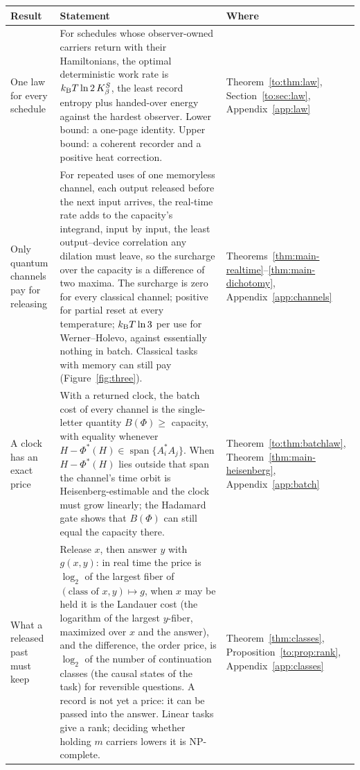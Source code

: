 \begin{table}[tbp]
\centering
\small
\begin{tabular}{@{}>{\raggedright\arraybackslash}p{3.1cm}>{\raggedright\arraybackslash}p{10.0cm}>{\raggedright\arraybackslash}p{2.5cm}@{}}
\toprule
Result & Statement & Where\\
\midrule
One law for every schedule & For schedules whose observer-owned carriers return with their Hamiltonians, the optimal deterministic work rate is $k_{\mathrm B} T\ln2\,K_\beta^S$, the least record entropy plus handed-over energy against the hardest observer. Lower bound: a one-page identity. Upper bound: a coherent recorder and a positive heat correction. & Theorem~\ref{to:thm:law}, Section~\ref{to:sec:law}, Appendix~\ref{app:law}\\
Only quantum channels pay for releasing & For repeated uses of one memoryless channel, each output released before the next input arrives, the real-time rate adds to the capacity's integrand, input by input, the least output--device correlation any dilation must leave, so the surcharge over the capacity is a difference of two maxima. The surcharge is zero for every classical channel; positive for partial reset at every temperature; $k_{\mathrm B} T\ln3$ per use for Werner--Holevo, against essentially nothing in batch. Classical tasks with memory can still pay (Figure~\ref{fig:three}). & Theorems~\ref{thm:main-realtime}--\ref{thm:main-dichotomy}, Appendix~\ref{app:channels}\\
A clock has an exact price & With a returned clock, the batch cost of every channel is the single-letter quantity $B(\Phi)\ge$ capacity, with equality whenever $H-\Phi^*(H)\in\operatorname{span}\{A_i^*A_j\}$. When $H-\Phi^*(H)$ lies outside that span the channel's time orbit is Heisenberg-estimable and the clock must grow linearly; the Hadamard gate shows that $B(\Phi)$ can still equal the capacity there. & Theorem~\ref{to:thm:batchlaw}, Theorem~\ref{thm:main-heisenberg}, Appendix~\ref{app:batch}\\
What a released past must keep & Release $x$, then answer $y$ with $g(x,y)$: in real time the price is $\log_2$ of the largest fiber of $(\text{class of }x,y)\mapsto g$, when $x$ may be held it is the Landauer cost (the logarithm of the largest $y$-fiber, maximized over $x$ and the answer), and the difference, the order price, is $\log_2$ of the number of continuation classes (the causal states of the task) for reversible questions. A record is not yet a price: it can be passed into the answer. Linear tasks give a rank; deciding whether holding $m$ carriers lowers it is NP-complete. & Theorem~\ref{thm:classes}, Proposition~\ref{to:prop:rank}, Appendix~\ref{app:classes}\\

\end{tabular}
\end{table}
